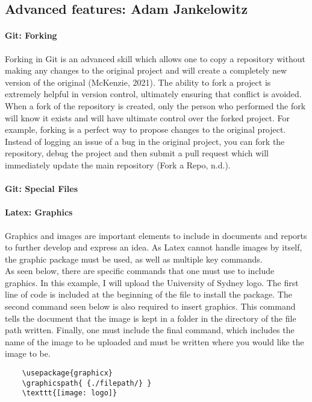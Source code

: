 \documentclass[a4paper, 11pt]{report}
\begin{document}
	\subsection{Advanced features: Adam Jankelowitz}
    \paragraph{Git: Forking} Forking in Git is an advanced skill which allows one to copy a repository without making any changes to the original project and will create a completely new version of the original (McKenzie, 2021). The ability to fork a project is extremely helpful in version control, ultimately ensuring that conflict is avoided. When a fork of the repository is created, only the person who performed the fork will know it exists and will have ultimate control over the forked project. For example, forking is a perfect way to propose changes to the original project. Instead of logging an issue of a bug in the original project, you can fork the repository, debug the project and then submit a pull request which will immediately update the main repository (Fork a Repo, n.d.).


    \paragraph{Git: Special Files}


    \paragraph{Latex: Graphics} Graphics and images are important elements to include in documents and reports to further develop and express an idea. As Latex cannot handle images by itself, the graphic package must be used, as well as multiple key commands.
    \\
    As seen below, there are specific commands that one must use to include graphics. In this example, I will upload the University of Sydney logo. The first line of code is included at the beginning of the file to install the package. The second command seen below is also required to insert graphics. This command tells the document that the image is kept in a folder in the directory of the file path written. Finally, one must include the final command, which includes the name of the image to be uploaded and must be written where you would like the image to be.

    \begin{verbatim}
    \usepackage{graphicx}
    \graphicspath{ {./filepath/} }
    \texttt{[image: logo]}
    \end{verbatim}
\end{document}

